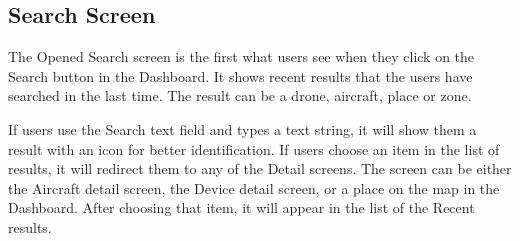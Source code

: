 \subsection{Search Screen}\label{subsec:search-screen}
The Opened Search screen is the first what users see when they click on the Search button in the Dashboard.
It shows recent results that the users have searched in the last time.
The result can be a drone, aircraft, place or zone.

If users use the Search text field and types a text string, it will show them a result with an icon for better identification.
If users choose an item in the list of results, it will redirect them to any of the Detail screens.
The screen can be either the Aircraft detail screen, the Device detail screen, or a place on the map in the Dashboard.
After choosing that item, it will appear in the list of the Recent results.
